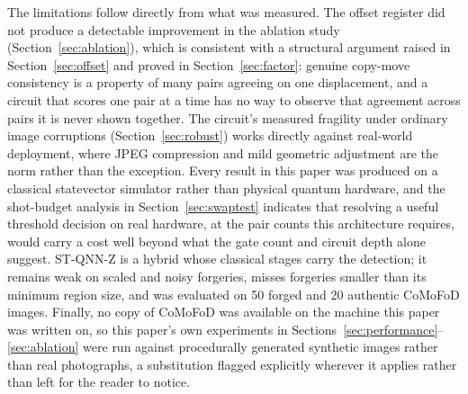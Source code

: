 \documentclass[conference]{IEEEtran}
\begin{document}
The limitations follow directly from what was measured. The offset register did not produce a detectable improvement in the ablation study (Section~\ref{sec:ablation}), which is consistent with a structural argument raised in Section~\ref{sec:offset} and proved in Section~\ref{sec:factor}: genuine copy-move consistency is a property of many pairs agreeing on one displacement, and a circuit that scores one pair at a time has no way to observe that agreement across pairs it is never shown together. The circuit's measured fragility under ordinary image corruptions (Section~\ref{sec:robust}) works directly against real-world deployment, where JPEG compression and mild geometric adjustment are the norm rather than the exception. Every result in this paper was produced on a classical statevector simulator rather than physical quantum hardware, and the shot-budget analysis in Section~\ref{sec:swaptest} indicates that resolving a useful threshold decision on real hardware, at the pair counts this architecture requires, would carry a cost well beyond what the gate count and circuit depth alone suggest. ST-QNN-Z is a hybrid whose classical stages carry the detection; it remains weak on scaled and noisy forgeries, misses forgeries smaller than its minimum region size, and was evaluated on 50 forged and 20 authentic CoMoFoD images. Finally, no copy of CoMoFoD was available on the machine this paper was written on, so this paper's own experiments in Sections~\ref{sec:performance}--\ref{sec:ablation} were run against procedurally generated synthetic images rather than real photographs, a substitution flagged explicitly wherever it applies rather than left for the reader to notice.
\end{document}

